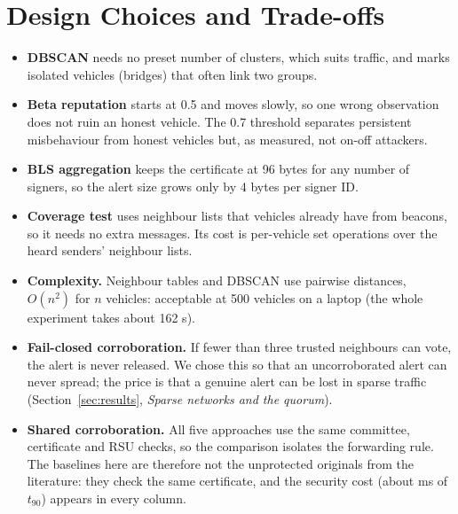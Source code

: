 \documentclass[11pt, a4paper]{article}
\begin{document}
\section{Design Choices and Trade-offs}
\begin{itemize}[noitemsep, topsep=2pt]
  \item \textbf{DBSCAN} needs no preset number of clusters, which suits traffic, and marks isolated vehicles (bridges)
        that often link two groups.
  \item \textbf{Beta reputation} starts at 0.5 and moves slowly, so one wrong observation does not ruin an honest vehicle.
        The 0.7 threshold separates persistent misbehaviour from honest vehicles but, as measured, not on-off attackers.
  \item \textbf{BLS aggregation} keeps the certificate at 96 bytes for any number of signers, so the alert size grows only
        by 4 bytes per signer ID.
  \item \textbf{Coverage test} uses neighbour lists that vehicles already have from beacons, so it needs no extra
        messages. Its cost is per-vehicle set operations over the heard senders' neighbour lists.
  \item \textbf{Complexity.} Neighbour tables and DBSCAN use pairwise distances, $O(n^2)$ for $n$ vehicles: acceptable at
        500 vehicles on a laptop (the whole experiment takes about 162 s).
  \item \textbf{Fail-closed corroboration.} If fewer than three trusted neighbours can vote, the alert is never released.
        We chose this so that an uncorroborated alert can never spread; the price is that a genuine alert can be lost in
        sparse traffic (Section~\ref{sec:results}, \emph{Sparse networks and the quorum}).
  \item \textbf{Shared corroboration.} All five approaches use the same committee, certificate and RSU checks, so the
        comparison isolates the forwarding rule. The baselines here are therefore not the unprotected originals from the
        literature: they check the same certificate, and the security cost (about \NSecTn{} ms of $t_{90}$) appears in
        every column.
\end{itemize}

\end{document}

